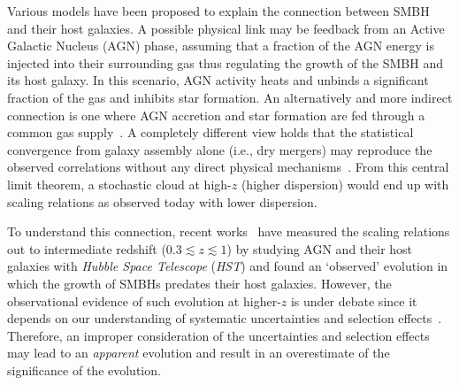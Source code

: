\documentclass{natureprintstyle}
\begin{document}
Various models have been proposed to explain the connection between SMBH and their host galaxies. A possible physical link may be feedback from an Active Galactic Nucleus (AGN) phase, assuming that a fraction of the AGN energy is injected into their surrounding gas thus regulating the growth of the SMBH and its host galaxy. In this scenario, AGN activity heats and unbinds a significant fraction of the gas and inhibits star formation. An alternatively and more indirect connection is one where AGN accretion and star formation are fed through a common gas supply~\cite{Cen2015, Menci2016}. A completely different view holds that the statistical convergence from galaxy assembly alone (i.e., dry mergers) may reproduce the observed correlations without any direct physical mechanisms~\cite{Peng2007, Jahnke2011, Hirschmann2010}. From this central limit theorem, a stochastic cloud at high-$z$ (higher dispersion) would end up with scaling relations as observed today with lower dispersion.

To understand this connection, recent works~\cite{Park15, Tre++07, Bennert11, Woo++08} have measured the scaling relations out to intermediate redshift {($0.3\lesssim z \lesssim1$)} by studying AGN and their host galaxies with {\it Hubble Space Telescope} ({\it HST}) and found an `observed' evolution in which the growth of SMBHs predates their host galaxies. However, the observational evidence of such evolution at higher-$z$ is under debate since it depends on our understanding of systematic uncertainties and selection effects~\cite{Tre++07,Lauer2007}. Therefore, an improper consideration of the uncertainties and selection effects may lead to an {\it apparent} evolution and result in an overestimate of the significance of the evolution\cite{Volonteri2011}.
\end{document}
